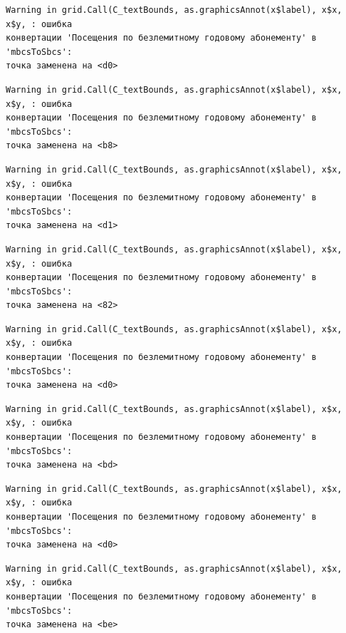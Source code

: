 \documentclass[
  letterpaper,
  DIV=11,
  numbers=noendperiod]{scrreprt}
\begin{document}
\begin{verbatim}
Warning in grid.Call(C_textBounds, as.graphicsAnnot(x$label), x$x, x$y, : ошибка
конвертации 'Посещения по безлемитному годовому абонементу' в 'mbcsToSbcs':
точка заменена на <d0>
\end{verbatim}

\begin{verbatim}
Warning in grid.Call(C_textBounds, as.graphicsAnnot(x$label), x$x, x$y, : ошибка
конвертации 'Посещения по безлемитному годовому абонементу' в 'mbcsToSbcs':
точка заменена на <b8>
\end{verbatim}

\begin{verbatim}
Warning in grid.Call(C_textBounds, as.graphicsAnnot(x$label), x$x, x$y, : ошибка
конвертации 'Посещения по безлемитному годовому абонементу' в 'mbcsToSbcs':
точка заменена на <d1>
\end{verbatim}

\begin{verbatim}
Warning in grid.Call(C_textBounds, as.graphicsAnnot(x$label), x$x, x$y, : ошибка
конвертации 'Посещения по безлемитному годовому абонементу' в 'mbcsToSbcs':
точка заменена на <82>
\end{verbatim}

\begin{verbatim}
Warning in grid.Call(C_textBounds, as.graphicsAnnot(x$label), x$x, x$y, : ошибка
конвертации 'Посещения по безлемитному годовому абонементу' в 'mbcsToSbcs':
точка заменена на <d0>
\end{verbatim}

\begin{verbatim}
Warning in grid.Call(C_textBounds, as.graphicsAnnot(x$label), x$x, x$y, : ошибка
конвертации 'Посещения по безлемитному годовому абонементу' в 'mbcsToSbcs':
точка заменена на <bd>
\end{verbatim}

\begin{verbatim}
Warning in grid.Call(C_textBounds, as.graphicsAnnot(x$label), x$x, x$y, : ошибка
конвертации 'Посещения по безлемитному годовому абонементу' в 'mbcsToSbcs':
точка заменена на <d0>
\end{verbatim}

\begin{verbatim}
Warning in grid.Call(C_textBounds, as.graphicsAnnot(x$label), x$x, x$y, : ошибка
конвертации 'Посещения по безлемитному годовому абонементу' в 'mbcsToSbcs':
точка заменена на <be>
\end{verbatim}
\end{document}
